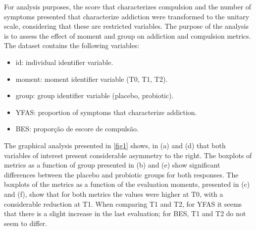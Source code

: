 \documentclass[AMA,STIX1COL]{WileyNJD-v2}
\begin{document}

For analysis purposes, the score that characterizes compulsion and the number of symptoms presented that characterize addiction were transformed to the unitary scale, considering that these are restricted variables. The purpose of the analysis is to assess the effect of moment and group on addiction and compulsion metrics. The dataset contains the following variables:

\begin{itemize}
  \item id: individual identifier variable.
  \item moment: moment identifier variable (T0, T1, T2).
  \item group: group identifier variable (placebo, probiotic).
  \item YFAS: proportion of symptoms that characterize addiction.
  \item BES: proporção de escore de compulsão.
\end{itemize}


The graphical analysis presented in \autoref{fig1} shows, in (a) and (d) that both variables of interest present considerable asymmetry to the right. The boxplots of metrics as a function of group presented in (b) and (e) show significant differences between the placebo and probiotic groups for both responses. The boxplots of the metrics as a function of the evaluation moments, presented in (c) and (f), show that for both metrics the values were higher at T0, with a considerable reduction at T1. When comparing T1 and T2, for YFAS it seems that there is a slight increase in the last evaluation; for BES, T1 and T2 do not seem to differ.  
\end{document}
